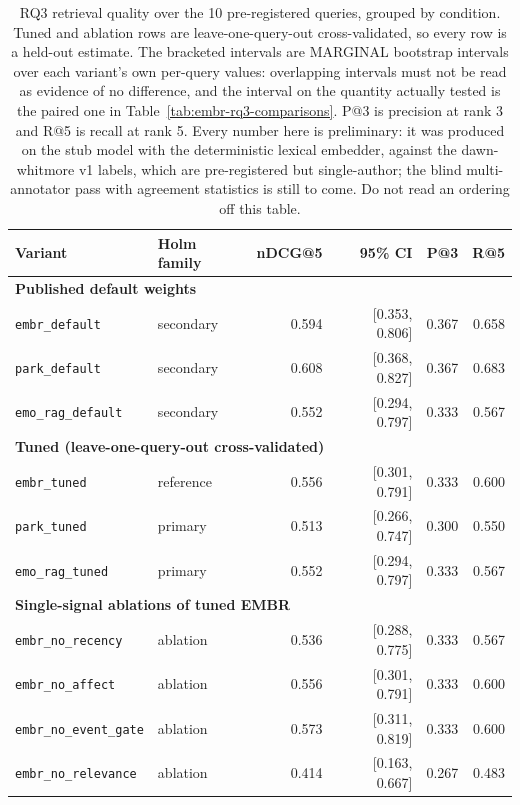 \begin{table}[tb]
  \centering
  \caption{%
    RQ3 retrieval quality over the 10 pre-registered queries, grouped by condition. Tuned and
    ablation rows are leave-one-query-out cross-validated, so every row is a held-out estimate. The
    bracketed intervals are MARGINAL bootstrap intervals over each variant's own per-query values:
    overlapping intervals must not be read as evidence of no difference, and the interval on the
    quantity actually tested is the paired one in Table~\ref{tab:embr-rq3-comparisons}. P@3 is
    precision at rank 3 and R@5 is recall at rank 5. Every number here is preliminary: it was
    produced on the stub model with the deterministic lexical embedder, against the dawn-whitmore v1
    labels, which are pre-registered but single-author; the blind multi-annotator pass with
    agreement statistics is still to come. Do not read an ordering off this table.
  }
  \label{tab:embr-rq3-retrieval}
  \small
  \begin{tabular}{llrrrr}
    \toprule
    Variant & Holm family & nDCG@5 & 95\% CI & P@3 & R@5 \\
    \midrule
    \multicolumn{6}{l}{\textbf{Published default weights}} \\
    \texttt{embr\_default} & secondary & 0.594 & [0.353, 0.806] & 0.367 & 0.658 \\
    \texttt{park\_default} & secondary & 0.608 & [0.368, 0.827] & 0.367 & 0.683 \\
    \texttt{emo\_rag\_default} & secondary & 0.552 & [0.294, 0.797] & 0.333 & 0.567 \\
    \midrule
    \multicolumn{6}{l}{\textbf{Tuned (leave-one-query-out cross-validated)}} \\
    \texttt{embr\_tuned} & reference & 0.556 & [0.301, 0.791] & 0.333 & 0.600 \\
    \texttt{park\_tuned} & primary & 0.513 & [0.266, 0.747] & 0.300 & 0.550 \\
    \texttt{emo\_rag\_tuned} & primary & 0.552 & [0.294, 0.797] & 0.333 & 0.567 \\
    \midrule
    \multicolumn{6}{l}{\textbf{Single-signal ablations of tuned EMBR}} \\
    \texttt{embr\_no\_recency} & ablation & 0.536 & [0.288, 0.775] & 0.333 & 0.567 \\
    \texttt{embr\_no\_affect} & ablation & 0.556 & [0.301, 0.791] & 0.333 & 0.600 \\
    \texttt{embr\_no\_event\_gate} & ablation & 0.573 & [0.311, 0.819] & 0.333 & 0.600 \\
    \texttt{embr\_no\_relevance} & ablation & 0.414 & [0.163, 0.667] & 0.267 & 0.483 \\
    \bottomrule
  \end{tabular}
\end{table}
